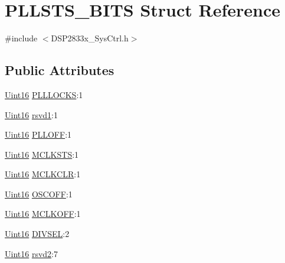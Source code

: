 \hypertarget{struct_p_l_l_s_t_s___b_i_t_s}{}\section{P\+L\+L\+S\+T\+S\+\_\+\+B\+I\+T\+S Struct Reference}
\label{struct_p_l_l_s_t_s___b_i_t_s}


{\ttfamily \#include $<$D\+S\+P2833x\+\_\+\+Sys\+Ctrl.\+h$>$}

\subsection*{Public Attributes}
\begin{DoxyCompactItemize}
\item 
\hyperlink{_d_s_p2833x___device_8h_a59a9f6be4562c327cbfb4f7e8e18f08b}{Uint16} \hyperlink{struct_p_l_l_s_t_s___b_i_t_s_a7df1b8bd1fc8617ecd13cfd4087bb962}{P\+L\+L\+L\+O\+C\+K\+S}\+:1
\item 
\hyperlink{_d_s_p2833x___device_8h_a59a9f6be4562c327cbfb4f7e8e18f08b}{Uint16} \hyperlink{struct_p_l_l_s_t_s___b_i_t_s_a9fc55d573939747d85d2663590ca8387}{rsvd1}\+:1
\item 
\hyperlink{_d_s_p2833x___device_8h_a59a9f6be4562c327cbfb4f7e8e18f08b}{Uint16} \hyperlink{struct_p_l_l_s_t_s___b_i_t_s_a974b1c4341ab7ed28344c79337d69c8b}{P\+L\+L\+O\+F\+F}\+:1
\item 
\hyperlink{_d_s_p2833x___device_8h_a59a9f6be4562c327cbfb4f7e8e18f08b}{Uint16} \hyperlink{struct_p_l_l_s_t_s___b_i_t_s_aabb0abd8c327153969a7a9a3463a32a2}{M\+C\+L\+K\+S\+T\+S}\+:1
\item 
\hyperlink{_d_s_p2833x___device_8h_a59a9f6be4562c327cbfb4f7e8e18f08b}{Uint16} \hyperlink{struct_p_l_l_s_t_s___b_i_t_s_a4210710247c95097119ec5b588610491}{M\+C\+L\+K\+C\+L\+R}\+:1
\item 
\hyperlink{_d_s_p2833x___device_8h_a59a9f6be4562c327cbfb4f7e8e18f08b}{Uint16} \hyperlink{struct_p_l_l_s_t_s___b_i_t_s_af0e53c081db44d376f5d093b2bd63f1c}{O\+S\+C\+O\+F\+F}\+:1
\item 
\hyperlink{_d_s_p2833x___device_8h_a59a9f6be4562c327cbfb4f7e8e18f08b}{Uint16} \hyperlink{struct_p_l_l_s_t_s___b_i_t_s_afca9a16d305fe5c407f8f71b06af76d0}{M\+C\+L\+K\+O\+F\+F}\+:1
\item 
\hyperlink{_d_s_p2833x___device_8h_a59a9f6be4562c327cbfb4f7e8e18f08b}{Uint16} \hyperlink{struct_p_l_l_s_t_s___b_i_t_s_ad40a2b788581cbf64fbcd0783178c4c6}{D\+I\+V\+S\+E\+L}\+:2
\item 
\hyperlink{_d_s_p2833x___device_8h_a59a9f6be4562c327cbfb4f7e8e18f08b}{Uint16} \hyperlink{struct_p_l_l_s_t_s___b_i_t_s_ab59888f251e1f1717d32526bf7d30540}{rsvd2}\+:7
\end{DoxyCompactItemize}


